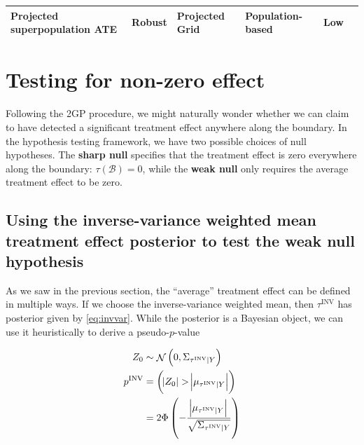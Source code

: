 \documentclass[letter]{article}
\let\Pr\relax
\DeclareMathOperator{\Pr}{\mathbb{P}}
\DeclareMathOperator{\normal}{\mathcal{N}}
\newcommand{\boundary}{\mathcal{B}}
\newcommand{\invvar}{\tau^{\mathrm{INV}}}
\begin{document}
\begin{longtable}[]{@{}llllll@{}}
\begin{minipage}[t]{0.25\columnwidth}
Projected superpopulation ATE\strut
\end{minipage} & \begin{minipage}[t]{0.13\columnwidth}\raggedright\strut
Robust\strut
\end{minipage} & \begin{minipage}[t]{0.13\columnwidth}\raggedright\strut
Projected Grid\strut
\end{minipage} & \begin{minipage}[t]{0.15\columnwidth}\raggedright\strut
Population-based\strut
\end{minipage} & \begin{minipage}[t]{0.08\columnwidth}\raggedright\strut
Low\strut
\end{minipage}\tabularnewline
\bottomrule
\end{longtable}
    


    	\section{Testing for non-zero effect}\label{testing-for-non-zero-effect}
    

\label{sec:hypothesis_testing}
    	Following the 2GP procedure, we might naturally wonder whether we can claim to have detected a significant treatment effect anywhere along the boundary.
In the hypothesis testing framework, we have two possible choices of null hypotheses.
The \textbf{sharp null} specifies that the treatment effect is zero everywhere along the boundary:
\(\tau(\boundary)=0\),
while the \textbf{weak null} only requires the average treatment effect to be zero.

\subsection{Using the inverse-variance weighted mean treatment effect posterior to test the weak null hypothesis}\label{using-the-inverse-variance-weighted-mean-treatment-effect-posterior-to-test-the-weak-null-hypothesis}

As we saw in the previous section, the ``average'' treatment effect can be defined in multiple ways.
If we choose the inverse-variance weighted mean, then \(\invvar\) has posterior given by \eqref{eq:invvar}.
While the posterior is a Bayesian object, we can use it heuristically to derive a pseudo-\(p\)-value

\begin{equation}
\begin{split}
    Z_0 &\sim \normal\del{0, \Sigma_{\invvar \mid Y}}  \\
    p^{\mathrm{INV}} &= \Pr\del{ 
        \abs{Z_0} > 
        \abs{
            \mu_{
                \invvar \mid Y
            }
        } 
    } \\
    &= 2\Phi\del{-
        \frac{
            \abs{
                \mu_{
                    \invvar \mid Y
                }
            }
        }{
            \sqrt{
                \Sigma_{\invvar \mid Y}
            }
        }
    }
\end{split}
\end{equation}
\end{document}
